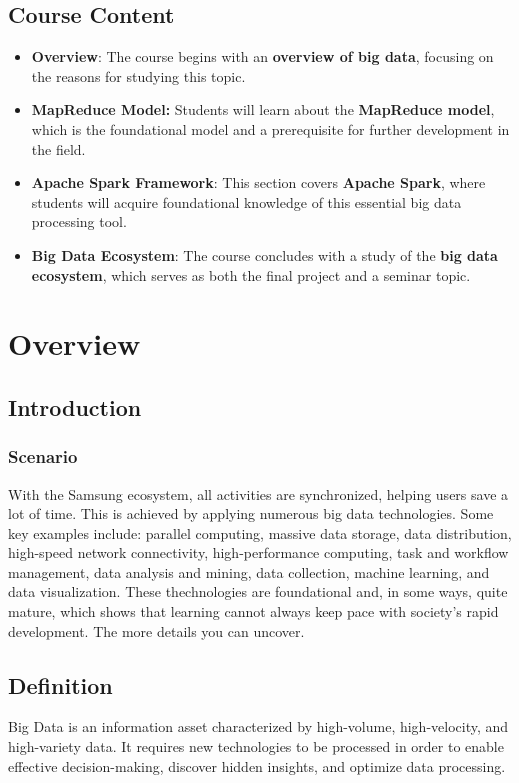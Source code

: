 \section{ Course Content }
\begin{itemize}
    \item \textbf{Overview}: The course begins with an \textbf{overview of big
        data}, focusing on the reasons for studying this topic.
    \item \textbf{MapReduce Model:} Students will learn about the 
        \textbf{MapReduce model}, which is the foundational model and a 
        prerequisite for further development in the field.
    \item \textbf{Apache Spark Framework}: This section covers \textbf{Apache
        Spark}, where students will acquire foundational knowledge of this
        essential big data processing tool.
    \item \textbf{Big Data Ecosystem}: The course concludes with a study of the
        \textbf{big data ecosystem}, which serves as both the final project and
        a seminar topic.
\end{itemize}
\chapter{ Overview }
\section{ Introduction }
\subsection{ Scenario }
    With the Samsung ecosystem, all activities are synchronized, helping users
    save a lot of time. This is achieved by applying numerous big data
    technologies. Some key examples include: parallel computing, massive data
    storage, data distribution, high-speed network connectivity,
    high-performance computing, task and workflow management, data analysis and
    mining, data collection, machine learning, and data visualization. These
    thechnologies are foundational and, in some ways, quite mature, which shows
    that learning cannot always keep pace with society's rapid development. The
    more details you can uncover.
\section{ Definition }
    Big Data is an information asset characterized by high-volume, 
    high-velocity, and high-variety data. It requires new technologies to be
    processed in order to enable effective decision-making, discover hidden
    insights, and optimize data processing.
